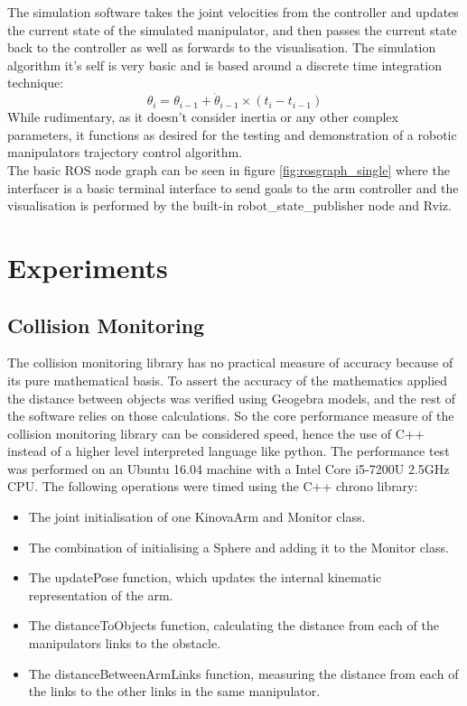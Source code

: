 \documentclass[a4paper, 10pt, conference]{ieeeconf}      %
\begin{document}
The simulation software takes the joint velocities from the controller and updates the current state of the simulated manipulator, and then passes the current state back to the controller as well as forwards to the visualisation. The simulation algorithm it's self is very basic and is based around a discrete time integration technique:
$$
\theta_i = \theta_{i-1} + \dot{\theta}_{i-1}\times (t_i - t_{i-1})
$$ 
While rudimentary, as it doesn't consider inertia or any other complex parameters, it functions as desired for the testing and demonstration of a robotic manipulators trajectory control algorithm. \\

The basic ROS node graph can be seen in figure \ref{fig:rosgraph_single} where the interfacer is a basic terminal interface to send goals to the arm controller and the visualisation is performed by the built-in robot\_state\_publisher node and Rviz.


\section{Experiments}

\subsection{Collision Monitoring} %
The collision monitoring library has no practical measure of accuracy because of its pure mathematical basis. To assert the accuracy of the mathematics applied the distance between objects was verified using Geogebra models, and the rest of the software relies on those calculations. So the core performance measure of the collision monitoring library can be considered speed, hence the use of C++ instead of a higher level interpreted language like python. The performance test was performed on an Ubuntu 16.04 machine with a Intel Core i5-7200U 2.5GHz CPU. The following operations were timed using the C++ chrono library:
\begin{itemize}
	\item The joint initialisation of one KinovaArm and Monitor class.
	\item The combination of initialising a Sphere and adding it to the Monitor class.
	\item The updatePose function, which updates the internal kinematic representation of the arm.
	\item The distanceToObjects function, calculating the distance from each of the manipulators links to the obstacle.
	\item The distanceBetweenArmLinks function, measuring the distance from each of the links to the other links in the same manipulator.
\end{itemize}
\end{document}
